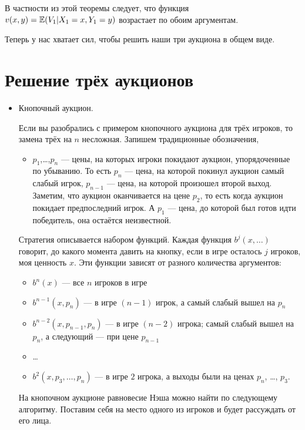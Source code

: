 В частности из этой теоремы следует, что функция $ v(x,y)=\operatorname{\mathbb{E}}(V_{1}|X_{1}=x, Y_{1}=y) $ возрастает по обоим аргументам.


Теперь у нас хватает сил, чтобы решить наши три аукциона в общем виде.

\section{Решение трёх аукционов}

\begin{itemize}
\item Кнопочный аукцион.

Если вы разобрались с примером кнопочного аукциона для трёх игроков, то замена трёх на $ n $ несложная. Запишем традиционные обозначения,

\begin{itemize}
\item $ p_{1} $,\ldots,$ p_{n} $ — цены, на которых игроки покидают аукцион, упорядоченные по убыванию. То есть $ p_{n} $ — цена, на которой покинул аукцион самый слабый игрок, $ p_{n-1} $ — цена, на которой произошел второй выход. Заметим, что аукцион оканчивается на цене $ p_{2} $, то есть когда аукцион покидает предпоследний игрок. А $ p_{1} $ — цена, до которой был готов идти победитель, она остаётся неизвестной.
\end{itemize}


Стратегия описывается набором функций. Каждая функция $b^j(x, \ldots)$ говорит, до какого момента давить на кнопку, если в игре осталось $j$ игроков, моя ценность $ x $. Эти функции зависят от разного количества аргументов:
\begin{itemize}
\item $ b^{n}(x) $ — все $ n $ игроков в игре
\item $ b^{n-1}(x,p_{n}) $ — в игре $ (n-1) $ игрок, а самый слабый вышел на $ p_{n} $
\item $ b^{n-2}(x,p_{n-1},p_{n}) $ —  в игре $ (n-2) $ игрока; самый слабый вышел на $ p_{n} $, а следующий — при цене $ p_{n-1} $
\item \ldots
\item $ b^{2}(x,p_{3},\ldots,p_{n}) $ — в игре $ 2 $ игрока, а выходы были на ценах $p_{n}$, \ldots, $ p_{3} $.
\end{itemize}

На кнопочном аукционе равновесие Нэша можно найти по следующему алгоритму. Поставим себя на место одного из игроков и будет рассуждать от его лица.


\end{itemize}

